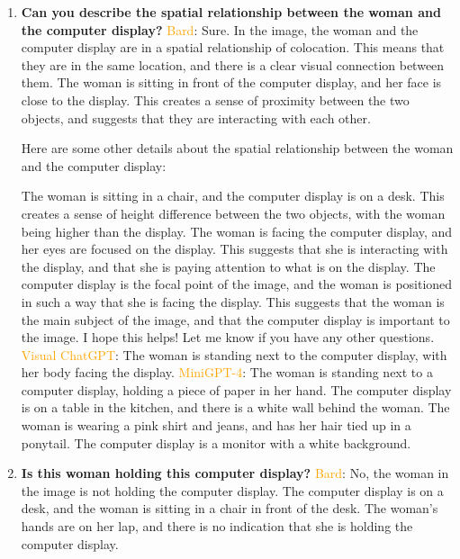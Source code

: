     \begin{enumerate}
        \item \textbf{Can you describe the spatial relationship between the woman and the computer display?}
        \subitem \textcolor{orange}{Bard}: 
        Sure. In the image, the woman and the computer display are in a spatial relationship of colocation. This means that they are in the same location, and there is a clear visual connection between them. The woman is sitting in front of the computer display, and her face is close to the display. This creates a sense of proximity between the two objects, and suggests that they are interacting with each other.

        Here are some other details about the spatial relationship between the woman and the computer display:

        The woman is sitting in a chair, and the computer display is on a desk. This creates a sense of height difference between the two objects, with the woman being higher than the display.
        The woman is facing the computer display, and her eyes are focused on the display. This suggests that she is interacting with the display, and that she is paying attention to what is on the display.
        The computer display is the focal point of the image, and the woman is positioned in such a way that she is facing the display. This suggests that the woman is the main subject of the image, and that the computer display is important to the image.
        I hope this helps! Let me know if you have any other questions.
        \subitem \textcolor{orange}{Visual ChatGPT}: The woman is standing next to the computer display, with her body facing the display.
        \subitem \textcolor{orange}{MiniGPT-4}: The woman is standing next to a computer display, holding a piece of paper in her hand. The computer display is on a table in the kitchen, and there is a white wall behind the woman. The woman is wearing a pink shirt and jeans, and has her hair tied up in a ponytail. The computer display is a monitor with a white background.
        \item \textbf{Is this woman holding this computer display?}
        \subitem \textcolor{orange}{Bard}: 
        No, the woman in the image is not holding the computer display. The computer display is on a desk, and the woman is sitting in a chair in front of the desk. The woman's hands are on her lap, and there is no indication that she is holding the computer display.
        

\end{enumerate}
